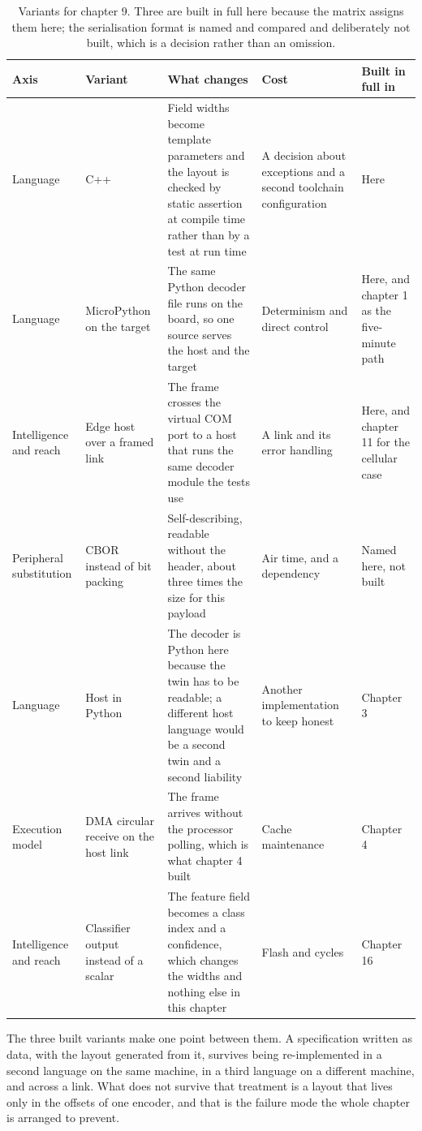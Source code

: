 \begin{table}[H]\centering\small
\begin{tabular}{p{24mm}p{26mm}p{44mm}p{22mm}p{20mm}}
\toprule
Axis & Variant & What changes & Cost & Built in full in \\
\midrule
Language & C++ & Field widths become template parameters and the layout is checked by static assertion at compile time rather than by a test at run time & A decision about exceptions and a second toolchain configuration & Here \\
Language & MicroPython on the target & The same Python decoder file runs on the board, so one source serves the host and the target & Determinism and direct control & Here, and chapter 1 as the five-minute path \\
Intelligence and reach & Edge host over a framed link & The frame crosses the virtual COM port to a host that runs the same decoder module the tests use & A link and its error handling & Here, and chapter 11 for the cellular case \\
Peripheral substitution & CBOR instead of bit packing & Self-describing, readable without the header, about three times the size for this payload & Air time, and a dependency & Named here, not built \\
Language & Host in Python & The decoder is Python here because the twin has to be readable; a different host language would be a second twin and a second liability & Another implementation to keep honest & Chapter 3 \\
Execution model & DMA circular receive on the host link & The frame arrives without the processor polling, which is what chapter 4 built & Cache maintenance & Chapter 4 \\
Intelligence and reach & Classifier output instead of a scalar & The feature field becomes a class index and a confidence, which changes the widths and nothing else in this chapter & Flash and cycles & Chapter 16 \\
\bottomrule
\end{tabular}
\caption{Variants for chapter 9. Three are built in full here because the matrix assigns them here; the serialisation format is named and compared and deliberately not built, which is a decision rather than an omission.}
\end{table}

The three built variants make one point between them. A specification written as
data, with the layout generated from it, survives being re-implemented in a
second language on the same machine, in a third language on a different machine,
and across a link. What does not survive that treatment is a layout that lives
only in the offsets of one encoder, and that is the failure mode the whole
chapter is arranged to prevent.

